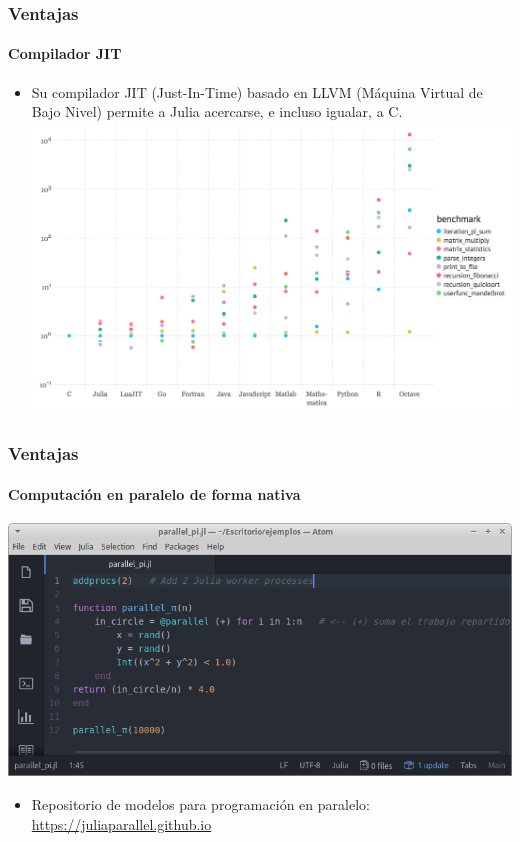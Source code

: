 \documentclass{beamer}
\begin{document}
\begin{frame}
\frametitle{Ventajas}
\framesubtitle{Compilador JIT}
\begin{itemize}
	\item Su compilador JIT (Just-In-Time) basado en LLVM (Máquina Virtual de Bajo Nivel) permite a Julia acercarse, e incluso igualar, a C.\\
	\includegraphics[scale=0.35]{images/benchmarking-julia}
\end{itemize}
\end{frame}

\begin{frame}
\frametitle{Ventajas}
\framesubtitle{Computación en paralelo de forma nativa}
\includegraphics[scale=0.37]{images/julia-pararell-pi}
\begin{itemize}
	\item Repositorio de modelos para programación en paralelo: \url{https://juliaparallel.github.io}
\end{itemize}
\end{frame}
\end{document}
